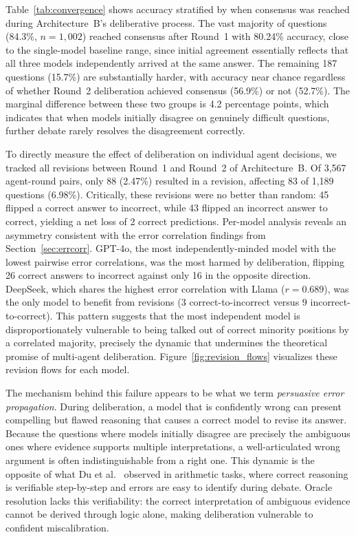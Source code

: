 Table~\ref{tab:convergence} shows accuracy stratified by when consensus was reached during Architecture~B's deliberative process. The vast majority of questions (84.3\%, $n = 1{,}002$) reached consensus after Round~1 with 80.24\% accuracy, close to the single-model baseline range, since initial agreement essentially reflects that all three models independently arrived at the same answer. The remaining 187 questions (15.7\%) are substantially harder, with accuracy near chance regardless of whether Round~2 deliberation achieved consensus (56.9\%) or not (52.7\%). The marginal difference between these two groups is 4.2 percentage points, which indicates that when models initially disagree on genuinely difficult questions, further debate rarely resolves the disagreement correctly.



To directly measure the effect of deliberation on individual agent decisions, we tracked all revisions between Round~1 and Round~2 of Architecture~B. Of 3{,}567 agent-round pairs, only 88 (2.47\%) resulted in a revision, affecting 83 of 1{,}189 questions (6.98\%). Critically, these revisions were no better than random: 45 flipped a correct answer to incorrect, while 43 flipped an incorrect answer to correct, yielding a net loss of 2 correct predictions. Per-model analysis reveals an asymmetry consistent with the error correlation findings from Section~\ref{sec:errcorr}. GPT-4o, the most independently-minded model with the lowest pairwise error correlations, was the most harmed by deliberation, flipping 26 correct answers to incorrect against only 16 in the opposite direction. DeepSeek, which shares the highest error correlation with Llama ($r = 0.689$), was the only model to benefit from revisions (3 correct-to-incorrect versus 9 incorrect-to-correct). This pattern suggests that the most independent model is disproportionately vulnerable to being talked out of correct minority positions by a correlated majority, precisely the dynamic that undermines the theoretical promise of multi-agent deliberation. Figure~\ref{fig:revision_flows} visualizes these revision flows for each model.

The mechanism behind this failure appears to be what we term \emph{persuasive error propagation}. During deliberation, a model that is confidently wrong can present compelling but flawed reasoning that causes a correct model to revise its answer. Because the questions where models initially disagree are precisely the ambiguous ones where evidence supports multiple interpretations, a well-articulated wrong argument is often indistinguishable from a right one. This dynamic is the opposite of what Du et al.~\cite{du2023debate} observed in arithmetic tasks, where correct reasoning is verifiable step-by-step and errors are easy to identify during debate. Oracle resolution lacks this verifiability: the correct interpretation of ambiguous evidence cannot be derived through logic alone, making deliberation vulnerable to confident miscalibration.


